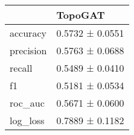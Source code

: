 \begin{tabular}{ll}
\toprule
 & TopoGAT \\
\midrule
accuracy & 0.5732 ± 0.0551 \\
precision & 0.5763 ± 0.0688 \\
recall & 0.5489 ± 0.0410 \\
f1 & 0.5181 ± 0.0534 \\
roc_auc & 0.5671 ± 0.0600 \\
log_loss & 0.7889 ± 0.1182 \\
\bottomrule
\end{tabular}
